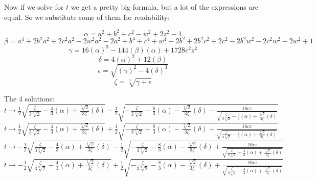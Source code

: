 \documentclass[12pt,a4paper,landscape]{amsart}
\numberwithin{equation}{section}
\theoremstyle{plain}
\theoremstyle{definition}
\begin{document}
\newpage
Now if we solve for $t$ we get a pretty big formula, but a lot of the expressions are equal. So we substitute some of them for readability:

\[\alpha = a^2+b^2+c^2-w^2+2 z^2-1\]
\[\beta = a^4+2 b^2 a^2+2 c^2 a^2-2 w^2 a^2-2 a^2+b^4+c^4+w^4-2 b^2+2 b^2 c^2+2 c^2-2 b^2 w^2-2 c^2 w^2-2 w^2+1\]
\[\gamma = 16 \left(\alpha\right)^3-144 \left(\beta\right) \left(\alpha\right)+1728 c^2 z^2\]
\[\delta = 4 \left(\alpha\right)^2+12 \left(\beta\right)\]
\[\epsilon = \sqrt{\left(\gamma\right)^2-4 \left(\delta\right)^3} \]
\[\zeta = \sqrt[3]{\gamma+\epsilon} \]

The 4 solutions:\\

$
t\to \frac{1}{2} \sqrt{\frac{\zeta}{3 \sqrt[3]{2}}-\frac{4}{3} \left(\alpha\right)+\frac{\sqrt[3]{2}}{3 \zeta}\left(\delta\right)}-\frac{1}{2} \sqrt{-\frac{\zeta}{3 \sqrt[3]{2}}-\frac{8}{3} \left(\alpha\right)-\frac{\sqrt[3]{2}}{3 \zeta}\left(\delta\right)-\frac{16 c z}{\sqrt{\frac{\zeta}{3 \sqrt[3]{2}}-\frac{4}{3} \left(\alpha\right)+\frac{\sqrt[3]{2}}{3 \zeta}\left(\delta\right)}}}
$\\

$
t\to \frac{1}{2} \sqrt{\frac{\zeta}{3 \sqrt[3]{2}}-\frac{4}{3} \left(\alpha\right)+\frac{\sqrt[3]{2}}{3 \zeta}\left(\delta\right)}+\frac{1}{2} \sqrt{-\frac{\zeta}{3 \sqrt[3]{2}}-\frac{8}{3} \left(\alpha\right)-\frac{\sqrt[3]{2}}{3 \zeta}\left(\delta\right)-\frac{16 c z}{\sqrt{\frac{\zeta}{3 \sqrt[3]{2}}-\frac{4}{3} \left(\alpha\right)+\frac{\sqrt[3]{2}}{3 \zeta}\left(\delta\right)}}}
$\\

$
t\to -\frac{1}{2} \sqrt{\frac{\zeta}{3 \sqrt[3]{2}}-\frac{4}{3} \left(\alpha\right)+\frac{\sqrt[3]{2}}{3 \zeta}\left(\delta\right)}-\frac{1}{2} \sqrt{-\frac{\zeta}{3 \sqrt[3]{2}}-\frac{8}{3} \left(\alpha\right)-\frac{\sqrt[3]{2}}{3 \zeta}\left(\delta\right)+\frac{16 c z}{\sqrt{\frac{\zeta}{3 \sqrt[3]{2}}-\frac{4}{3} \left(\alpha\right)+\frac{\sqrt[3]{2}}{3 \zeta}\left(\delta\right)}}}
$\\

$
t\to -\frac{1}{2} \sqrt{\frac{\zeta}{3 \sqrt[3]{2}}-\frac{4}{3} \left(\alpha\right)+\frac{\sqrt[3]{2}}{3 \zeta}\left(\delta\right)}+\frac{1}{2} \sqrt{-\frac{\zeta}{3 \sqrt[3]{2}}-\frac{8}{3} \left(\alpha\right)-\frac{\sqrt[3]{2}}{3 \zeta}\left(\delta\right)+\frac{16 c z}{\sqrt{\frac{\zeta}{3 \sqrt[3]{2}}-\frac{4}{3} \left(\alpha\right)+\frac{\sqrt[3]{2}}{3 \zeta}\left(\delta\right)}}}
$
\end{document}
